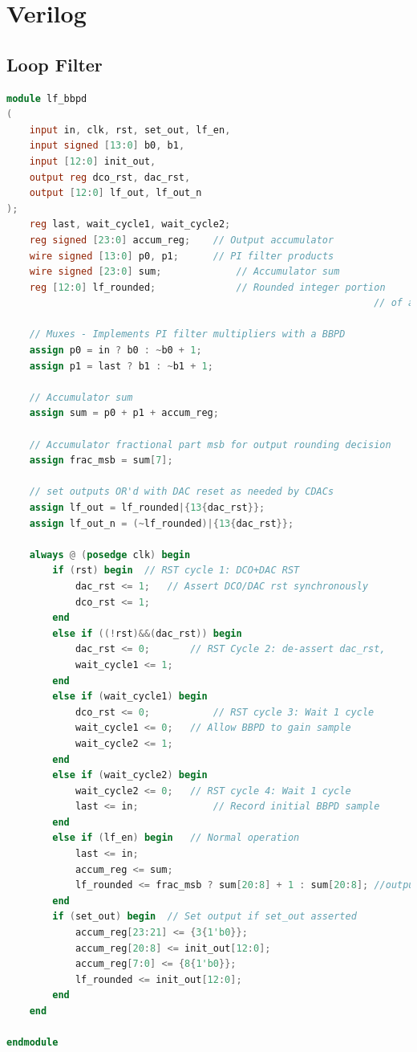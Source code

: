 	\appendix
	\section{Verilog}\label{sec:verilog}

		\subsection{Loop Filter} \label{sec:lf_verilog}

	\begin{lstlisting}[language={Verilog}, caption={Loop filter hardware description.}, label={sim_code2}]
module lf_bbpd
(
	input in, clk, rst, set_out, lf_en,
	input signed [13:0] b0, b1,
	input [12:0] init_out,
	output reg dco_rst, dac_rst,
	output [12:0] lf_out, lf_out_n
);
	reg last, wait_cycle1, wait_cycle2;
	reg signed [23:0] accum_reg;	// Output accumulator
	wire signed [13:0] p0, p1;		// PI filter products
	wire signed [23:0] sum;				// Accumulator sum
	reg [12:0] lf_rounded;				// Rounded integer portion
																// of accumulator for output

	// Muxes - Implements PI filter multipliers with a BBPD
	assign p0 = in ? b0 : ~b0 + 1; 
	assign p1 = last ? b1 : ~b1 + 1;

	// Accumulator sum
	assign sum = p0 + p1 + accum_reg;

	// Accumulator fractional part msb for output rounding decision
	assign frac_msb = sum[7];

	// set outputs OR'd with DAC reset as needed by CDACs
	assign lf_out = lf_rounded|{13{dac_rst}};
	assign lf_out_n = (~lf_rounded)|{13{dac_rst}};

	always @ (posedge clk) begin
    	if (rst) begin 	// RST cycle 1: DCO+DAC RST
			dac_rst <= 1; 	// Assert DCO/DAC rst synchronously
			dco_rst <= 1; 
		end
		else if ((!rst)&&(dac_rst)) begin  
			dac_rst <= 0;		// RST Cycle 2: de-assert dac_rst,		
			wait_cycle1 <= 1;
		end
		else if (wait_cycle1) begin
			dco_rst <= 0;			// RST cycle 3: Wait 1 cycle
			wait_cycle1 <= 0;	// Allow BBPD to gain sample
			wait_cycle2 <= 1;		
		end
		else if (wait_cycle2) begin
			wait_cycle2 <= 0;	// RST cycle 4: Wait 1 cycle
			last <= in;				// Record initial BBPD sample
		end
		else if (lf_en) begin 	// Normal operation
			last <= in;
			accum_reg <= sum;
			lf_rounded <= frac_msb ? sum[20:8] + 1 : sum[20:8]; //output rounding
		end
		if (set_out) begin 	// Set output if set_out asserted
			accum_reg[23:21] <= {3{1'b0}};
			accum_reg[20:8] <= init_out[12:0];
			accum_reg[7:0] <= {8{1'b0}};
			lf_rounded <= init_out[12:0];	
		end
	end

endmodule
	    \end{lstlisting}


